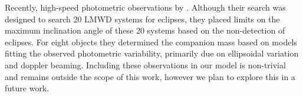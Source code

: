 \documentclass[letterpaper,12pt,preprint]{aastex}
\begin{document}
Recently, high-speed photometric observations by \citet{hermes14}. Although their search was designed to search 20 LMWD systems for eclipses, they placed limits on the maximum inclination angle of these 20 systems based on the non-detection of eclipses. For eight objects they determined the companion mass based on models fitting the observed photometric variability, primarily due on ellipsoidal variation and doppler beaming. Including these observations in our model is non-trivial and remains outside the scope of this work, however we plan to explore this in a future work.





%
% 



%
%





\end{document}

